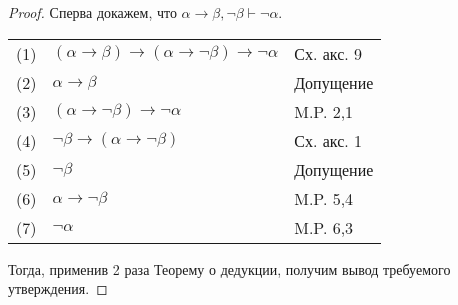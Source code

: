 \begin{proof}
Сперва докажем, что $\alpha \rightarrow \beta, \neg\beta \vdash \neg\alpha$.

\begin{tabular}{lll}
(1) & $(\alpha \rightarrow \beta) \rightarrow (\alpha \rightarrow \neg\beta) \rightarrow \neg\alpha$ & Сх. акс. 9\\
(2) & $\alpha \rightarrow \beta$ & Допущение\\
(3) & $(\alpha \rightarrow \neg\beta) \rightarrow \neg\alpha$ & M.P. 2,1\\
(4) & $\neg\beta \rightarrow (\alpha \rightarrow \neg\beta)$ & Сх. акс. 1\\
(5) & $\neg\beta$ & Допущение\\
(6) & $\alpha \rightarrow \neg\beta$ & M.P. 5,4\\
(7) & $\neg\alpha$ & M.P. 6,3
\end{tabular}


Тогда, применив 2 раза Теорему о дедукции, получим вывод требуемого утверждения.
\end{proof}

